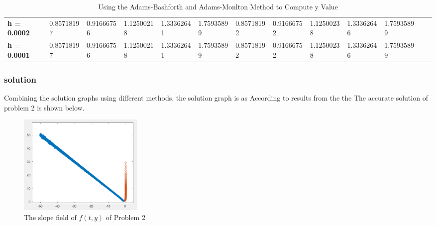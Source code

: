 \documentclass[a4paper]{article}
\begin{document}
\begin{table}[H]
{\begin{tabular}{@{}lllllllllllll@{}}
    \textbf{h = 0.0002}             & 0.85718197                             & 0.91666756                             & 1.12500218                            & 1.33362641                            & 1.75935899                                                            & 0.85718192                             & 0.91666752                             & 1.12500238                            & 1.33362646       & 1.75935899                  \\
    \textbf{h = 0.0001}             & 0.85718197                             & 0.91666756                             & 1.12500218                            & 1.33362641                            & 1.75935899                                                            & 0.85718192                             & 0.91666752                             & 1.12500238                            & 1.33362646       & 1.75935899         \\
    \bottomrule
    \end{tabular}%
    }
    \caption{Using the Adams-Bashforth and Adams-Monlton Method to Compute y Value }
    \label{tab:IVP2_AD}
    \end{table}
    
    \subsubsection{solution}
    Combining the solution graphs using different methods, the solution graph is as
	According to results from the the The accurate solution of problem 2 is shown below.
	
	\begin{figure}[H]
		\centering
		\includegraphics[width=6cm]{img/IVP_2.png}
		\caption{\label{IVP_2} The slope field of $f(t, y)$ of Problem 2}
	\end{figure}
    
        
\end{document}
